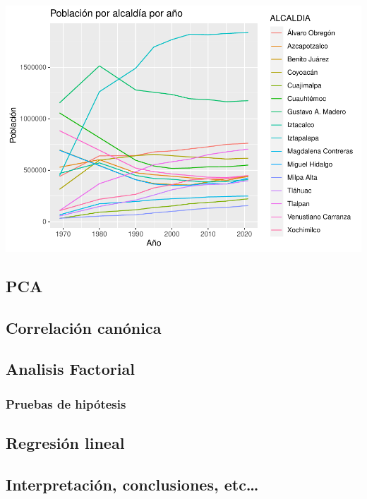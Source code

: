\documentclass[
]{article}
\begin{document}
\begin{center}\includegraphics{proyecto_files/figure-latex/unnamed-chunk-9-1} \end{center}

\hypertarget{pca}{%
\subsection{PCA}\label{pca}}

\hypertarget{correlaciuxf3n-canuxf3nica}{%
\subsection{Correlación canónica}\label{correlaciuxf3n-canuxf3nica}}

\hypertarget{analisis-factorial}{%
\subsection{Analisis Factorial}\label{analisis-factorial}}

\hypertarget{pruebas-de-hipuxf3tesis}{%
\subsubsection{Pruebas de hipótesis}\label{pruebas-de-hipuxf3tesis}}

\hypertarget{regresiuxf3n-lineal}{%
\subsection{Regresión lineal}\label{regresiuxf3n-lineal}}

\hypertarget{interpretaciuxf3n-conclusiones-etc}{%
\subsection{Interpretación, conclusiones,
etc\ldots{}}\label{interpretaciuxf3n-conclusiones-etc}}
\end{document}
